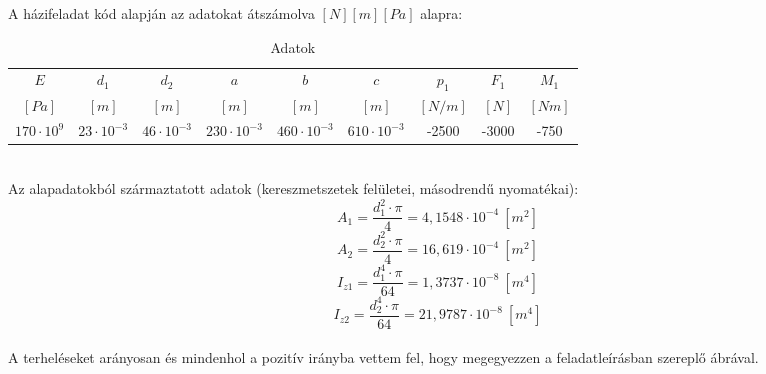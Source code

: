 \documentclass{article}
\begin{document}
		A házifeladat kód alapján az adatokat átszámolva $[N][m][Pa]$ alapra:
		\def\arraystretch{1.2}%
		\begin{table}[h!]
			\begin{center}
				\caption{Adatok}
				\label{tab:table1}
				\begin{tabular}{c|c|c|c|c|c|c|c|c} %
					$E$  	& $d_{1}$ 	& $d_{2}$ & $a$ & $b$ & $c$ & $p_{1}$ & $F_{1}$ & $M_{1}$ \\
					$[Pa]$ 	& $[m]$ 	& $[m]$ & $[m]$ & $[m]$ & $[m]$ & $[N/m]$ & $[N]$ & $[Nm]$\\
					\hline
					$170\cdot10^9$ & $23\cdot10^{-3}$ & $46\cdot10^{-3}$ & $230\cdot10^{-3}$ & $460\cdot10^{-3}$ & $610\cdot10^{-3}$ & -2500 & -3000 & -750\\
				\end{tabular}
			\end{center}
		\end{table}\\[10pt]
		\def\arraystretch{1}%
		Az alapadatokból származtatott adatok (kereszmetszetek felületei, másodrendű nyomatékai):	
		\begin{equation}
		A_1=\frac{d_1^{2}\cdot\pi}{4}=4,1548 \cdot 10^{-4}~[m^{2}]
		\end{equation}
		\begin{equation}
		A_2=\frac{d_2^{2}\cdot\pi}{4}=16,619 \cdot 10^{-4}~[m^{2}]
		\end{equation}
		\begin{equation}
		I_{z1}=\frac{d_1^4\cdot\pi}{64}=1,3737 \cdot 10^{-8}~[m^{4}]
		\end{equation}
		\begin{equation}
		I_{z2}=\frac{d_2^4\cdot\pi}{64}=21,9787 \cdot 10^{-8}~[m^{4}]
		\end{equation}\\[10pt]
		A terheléseket arányosan és mindenhol a pozitív irányba vettem fel, hogy megegyezzen a feladatleírásban szereplő ábrával.
	
	\newcommand{\degy}{8}
	\newcommand{\dketto}{16}
	
\end{document}
